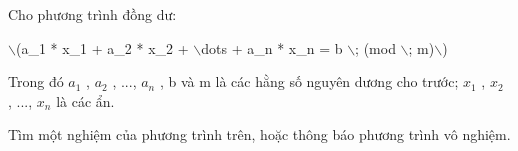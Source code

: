 Cho phương trình đồng dư:

$\backslash$(a\_1 * x\_1 + a\_2 * x\_2 + $\backslash$dots + a\_n * x\_n = b $\backslash$; (mod $\backslash$; m)$\backslash$)

Trong đó $a_{1}$ , $a_{2}$ , ..., $a_{n}$ , b và m là các hằng số nguyên dương cho trước; $x_{1}$ , $x_{2}$ , ..., $x_{n}$ là các ẩn.

Tìm một nghiệm của phương trình trên, hoặc thông báo phương trình vô nghiệm.